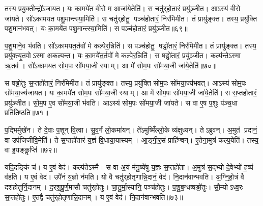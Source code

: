 तस्य॒ प्रयु॒क्तीन्द्रो॑ऽजायत।
यः का॒मये॑त वी॒रो म॒ आजा॑ये॒तेति॑।
स चतु॑र्‌होतारं॒ प्रयु॑ञ्जीत।
आऽस्य॑ वी॒रो जा॑यते।
सो॑ऽकामयत पशु॒मान्त्स्या॒मिति॑।
स चतु॑र्‌होतु॒ पञ्च॑होतारं॒ निर॑मिमीत।
तं प्रायु॑ङ्क्त।
तस्य॒ प्रयु॑क्ति पशु॒मान॑भवत्।
यः का॒मये॑त पशु॒मान्त्स्या॒मिति॑।
स पञ्च॑होतारं॒ प्रयु॑ञ्जीत॥६९॥

प॒शु॒माने॒व भ॑वति।
सो॑ऽकामयत॒र्तवो॑ मे कल्पेर॒न्निति॑।
स पञ्च॑होतु॒ षड्ढो॑तारं॒ निर॑मिमीत।
तं प्रायु॑ङ्क्त।
तस्य॒ प्रयु॑क्त्यृ॒तवोऽस्मा अकल्पन्त।
यः का॒मये॑त॒र्तवो॑ मे कल्पेर॒न्निति॑।
स षड्ढो॑तारं॒ प्रयु॑ञ्जीत।
कल्प॑न्तेऽस्मा ऋ॒तव॑।
सो॑ऽकामयत सोम॒पः सो॑मया॒जी स्याम्।
आ मे॑ सोम॒पः सो॑मया॒जी जा॑ये॒तेति॑॥७०॥

स षड्ढो॑तुः स॒प्तहो॑तारं॒ निर॑मिमीत।
तं प्रायु॑ङ्क्त।
तस्य॒ प्रयु॑क्ति सोम॒पः सो॑मया॒ज्य॑भवत्।
आऽस्य॑ सोम॒पः सो॑मया॒ज्य॑जायत।
यः का॒मये॑त सोम॒पः सो॑मया॒जी स्याम्।
आ मे॑ सोम॒पः सो॑मया॒जी जा॑ये॒तेति॑।
स स॒प्तहो॑तारं॒ प्रयु॑ञ्जीत।
सो॒म॒प ए॒व सो॑मया॒जी भ॑वति।
आऽस्य॑ सोम॒पः सो॑मया॒जी जा॑यते।
स वा ए॒ष प॒शुः प॑ञ्च॒धा प्रति॑तिष्ठति॥७१॥

प॒द्भिर्मुखे॑न।
ते दे॒वाः प॒शून् वि॒त्वा।
सु॒व॒र्गं लो॒कमा॑यन्।
ते॑ऽमुष्मिँ॑ल्लो॒के व्य॑क्षुध्यन्।
तेऽब्रुवन्।
अ॒मुत॑ प्रदानं॒ वा उप॑जिजीवि॒मेति॑।
ते स॒प्तहो॑तारं य॒ज्ञं वि॒धाया॒यास्यम्।
आ॒ङ्गी॒र॒सं प्राहि॑ण्वन्।
ए॒तेना॒मुत्र॑ कल्प॒येति॑।
तस्य॒ वा इ॒यङ्कॢप्ति॑॥७२॥

यदि॒दङ्किं च॑।
य ए॒वं वेद॑।
कल्प॑तेऽस्मै।
स वा अ॒यं म॑नु॒ष्ये॑षु य॒ज्ञः स॒प्तहो॑ता।
अ॒मुत्र॑ स॒द्भ्यो दे॒वेभ्यो॑ ह॒व्यं व॑हति।
य ए॒वं वेद॑।
उपै॑नं य॒ज्ञो न॑मति।
यो वै चतु॑र्‌होतृणान्नि॒दानं॒ वेद॑।
नि॒दान॑वान्भवति।
अ॒ग्नि॒हो॒त्रं वै दश॑होतुर्नि॒दानम्।
द॒र्‌श॒पू॒र्ण॒मासौ चतु॑र्‌होतुः।
चा॒तु॒र्मा॒स्यानि॒ पञ्च॑होतुः।
प॒शु॒ब॒न्धष्षड्ढो॑तुः।
सौ॒म्योऽध्व॒रः स॒प्तहो॑तुः।
ए॒तद्वै चतु॑र्‌होतृणान्नि॒दानम्।
य ए॒वं वेद॑।
नि॒दान॑वान्भवति॥७३॥\anuvakamend[अ॒मि॒मी॒त॒ तं प्रायु॑ङ्क्त॒ पञ्च॑होतारं॒ प्र यु॑ञ्जीत जाये॒तेति॑ तिष्ठति॒ कॢप्ति॒र्दश॑होतुर्नि॒दान स॒प्त च॑]




\clearpage
{}
\setcounter{anuvakam}{0}

